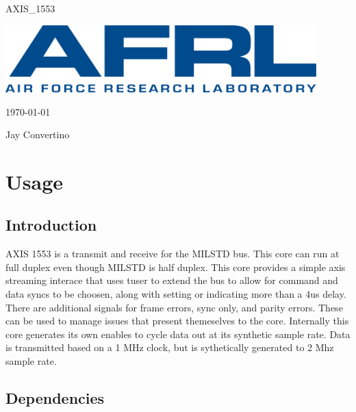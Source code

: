 \begin{titlepage}
  \begin{center}

  {\Huge AXIS\_1553}

  \vspace{25mm}

  \includegraphics[width=0.90\textwidth,height=\textheight,keepaspectratio]{img/AFRL.png}

  \vspace{25mm}

  \today

  \vspace{15mm}

  {\Large Jay Convertino}

  \end{center}
\end{titlepage}

\tableofcontents

\newpage

\section{Usage}

\subsection{Introduction}

\par
AXIS 1553 is a transmit and receive for the MIL\-STD bus. This core can run at full duplex even though
MIL\-STD is half duplex. This core provides a simple axis streaming interace that uses tuser to extend the
bus to allow for command and data syncs to be choosen, along with setting or indicating more than a 4us delay. 
There are additional signals for frame errors, sync only, and parity errors. These can be used to manage issues
that present themeselves to the core. Internally this core generates its own enables to cycle data out at its 
synthetic sample rate. Data is transmitted based on a 1 MHz clock, but is sythetically generated to 2 Mhz sample rate.

\subsection{Dependencies}

